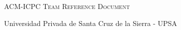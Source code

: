 \documentclass[letterpaper]{amsart}
\begin{document}
  \thispagestyle{fancy}
  
  \begin{center}
    \Huge\textsc{ACM-ICPC Team Reference Document}

    \huge Universidad Privada de Santa Cruz de la Sierra - UPSA

    \vspace{0.50cm}
  \end{center}
  
  \begin{multicols*}{2}
    \tableofcontents
  \end{multicols*}
  
  \enlargethispage*{\baselineskip}
  \pagebreak
  
  
  \setcounter{page}{1}
  
\end{document}
